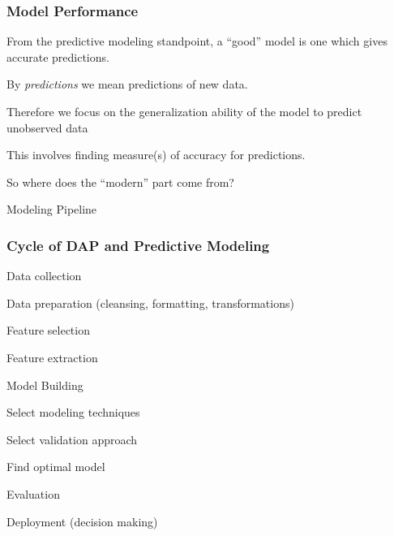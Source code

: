 \documentclass[12pt]{beamer}\usepackage[]{graphicx}\usepackage[]{color}
\begin{document}

\begin{frame}
\frametitle{Model Performance}

\bbi
  \item From the predictive modeling standpoint, a ``good'' model is one which gives accurate predictions.
  \item By \textit{predictions} we mean predictions of new data.
  \item Therefore we focus on the generalization ability of the model to predict unobserved data
  \item This involves finding measure(s) of accuracy for predictions.
\ei

\end{frame}


\begin{frame}
\begin{center}
{\lolit So where does the ``modern'' part come from?}

\Large{\mdlit Modeling Pipeline}
\end{center}
\end{frame}


\begin{frame}[fragile]
\frametitle{Cycle of DAP and Predictive Modeling}

\bi
  \item Data collection
  \item Data preparation (cleansing, formatting, transformations)
  \bi
    \item Feature selection
    \item Feature extraction
  \ei
  \item Model Building
  \bi
    \item Select modeling techniques
    \item Select validation approach
    \item Find optimal model
  \ei
  \item Evaluation
  \item Deployment (decision making)
\ei

\end{frame}

\end{document}
